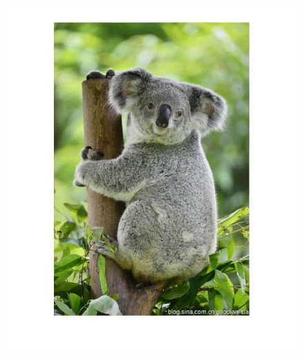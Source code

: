 \documentclass{article}
\theoremstyle{plain} \newtheorem{thm}{Theorem}
\begin{document}
\begin{figure}
\begin{minipage}{.5\linewidth}
	\end{minipage}
	\begin{minipage}{.5\linewidth}
		\includegraphics[width=\linewidth]{koala_recovered_cyclic.jpg}
	\end{minipage}
\end{figure}
\end{document}
